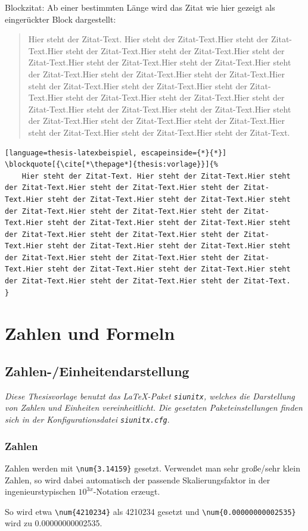 			\noindent
			Blockzitat: Ab einer bestimmten Länge wird das Zitat wie hier gezeigt als eingerückter Block dargestellt:
%			
			\begin{vorlagenbeispiel}
				\blockquote[{\cite[\thepage]{thesis:vorlage}}]{%
					Hier steht der Zitat-Text. Hier steht der Zitat-Text.Hier steht der Zitat-Text.Hier steht der Zitat-Text.Hier steht der Zitat-Text.Hier steht der Zitat-Text.Hier steht der Zitat-Text.Hier steht der Zitat-Text.Hier steht der Zitat-Text.Hier steht der Zitat-Text.Hier steht der Zitat-Text.Hier steht der Zitat-Text.Hier steht der Zitat-Text.Hier steht der Zitat-Text.Hier steht der Zitat-Text.Hier steht der Zitat-Text.Hier steht der Zitat-Text.Hier steht der Zitat-Text.Hier steht der Zitat-Text.Hier steht der Zitat-Text.Hier steht der Zitat-Text.Hier steht der Zitat-Text.Hier steht der Zitat-Text.Hier steht der Zitat-Text.Hier steht der Zitat-Text.
				}
			\end{vorlagenbeispiel}
			\begin{lstlisting}[language=thesis-latexbeispiel, escapeinside={*}{*}]
\blockquote[{\cite[*\thepage*]{thesis:vorlage}}]{%
	Hier steht der Zitat-Text. Hier steht der Zitat-Text.Hier steht der Zitat-Text.Hier steht der Zitat-Text.Hier steht der Zitat-Text.Hier steht der Zitat-Text.Hier steht der Zitat-Text.Hier steht der Zitat-Text.Hier steht der Zitat-Text.Hier steht der Zitat-Text.Hier steht der Zitat-Text.Hier steht der Zitat-Text.Hier steht der Zitat-Text.Hier steht der Zitat-Text.Hier steht der Zitat-Text.Hier steht der Zitat-Text.Hier steht der Zitat-Text.Hier steht der Zitat-Text.Hier steht der Zitat-Text.Hier steht der Zitat-Text.Hier steht der Zitat-Text.Hier steht der Zitat-Text.Hier steht der Zitat-Text.Hier steht der Zitat-Text.Hier steht der Zitat-Text.
}
			\end{lstlisting}
		
	\section{Zahlen und Formeln}
		\subsection{Zahlen-/Einheitendarstellung}
			\emph{Diese Thesisvorlage benutzt das \LaTeX-Paket \lstinline|siunitx|, welches die Darstellung von Zahlen und Einheiten vereinheitlicht. Die gesetzten Paketeinstellungen finden sich in der Konfigurationsdatei \lstinline|siunitx.cfg|}.
			
			\subsubsection{Zahlen}
				Zahlen werden mit \lstinline|\num{3.14159}| gesetzt.
				Verwendet man sehr große/sehr klein Zahlen, so wird dabei automatisch der passende Skalierungsfaktor in der ingenieurstypischen $10^{3x}$-Notation erzeugt.
				\begin{vorlagenbeispiel}
					So wird etwa \lstinline|\num{4210234}| als \num{4210234} gesetzt und \lstinline|\num{0.00000000002535}| wird zu \num{0.00000000002535}.
				\end{vorlagenbeispiel}
				\medskip
				
